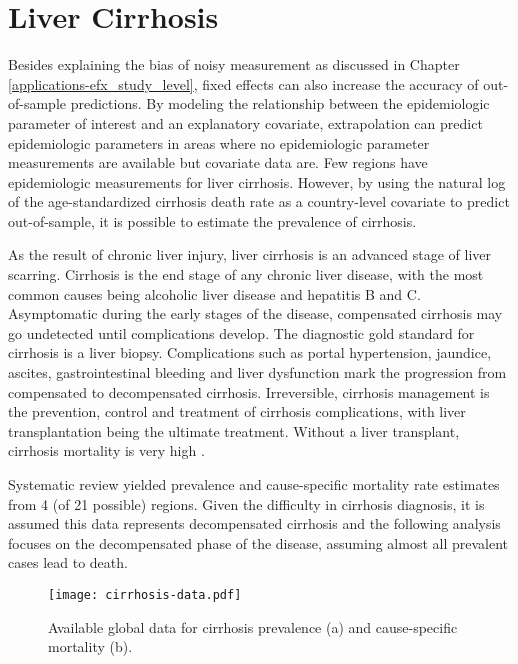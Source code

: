 \chapter{Liver Cirrhosis}
\label{applications-efx_country_level}

Besides explaining the bias of noisy measurement as discussed in Chapter \ref{applications-efx_study_level}, fixed effects can also increase the accuracy of out-of-sample predictions.  By modeling the relationship between the epidemiologic parameter of interest and an explanatory covariate, extrapolation can predict epidemiologic parameters in areas where no epidemiologic parameter measurements are available but covariate data are.  Few regions have epidemiologic measurements for liver cirrhosis.  However, by using the natural log of the age-standardized cirrhosis death rate as a country-level covariate to predict out-of-sample, it is possible to estimate the prevalence of cirrhosis.

As the result of chronic liver injury, liver cirrhosis is an advanced stage of liver scarring.  Cirrhosis is the end stage of any chronic liver disease, with the most common causes being alcoholic liver disease and hepatitis B and C.  Asymptomatic during the early stages of the disease, compensated cirrhosis may go undetected until complications develop.  The diagnostic gold standard for cirrhosis is a liver biopsy.  Complications such as portal hypertension, jaundice, ascites, gastrointestinal bleeding and liver dysfunction mark the progression from compensated to decompensated cirrhosis.  Irreversible, cirrhosis management is the prevention, control and treatment of cirrhosis complications, with liver transplantation being the ultimate treatment.  Without a liver transplant, cirrhosis mortality is very high \cite{garcia-tsao_management_2009, d'amico_natural_2006, schuppan_liver_2008}.

Systematic review yielded prevalence and cause-specific mortality rate estimates from 4 (of 21 possible) regions.  Given the difficulty in cirrhosis diagnosis, it is assumed this data represents decompensated cirrhosis and the following analysis focuses on the decompensated phase of the disease, assuming almost all prevalent cases lead to death.

    \begin{figure}[h]
        \begin{center}
            \texttt{[image: cirrhosis-data.pdf]}
            \caption{Available global data for cirrhosis prevalence (a) and cause-specific mortality (b).}
            \label{fig:app-cirrhosis data}
        \end{center}
    \end{figure}

